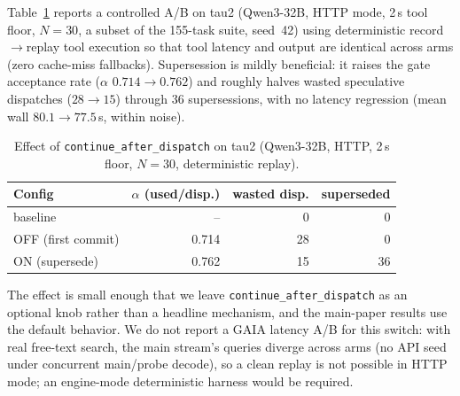 Table~\ref{tab:supersede} reports a controlled A/B on tau2 (Qwen3-32B, HTTP mode, 2\,s tool
floor, $N{=}30$, a subset of the 155-task suite, seed~42) using deterministic record$\to$replay tool execution so that tool
latency and output are identical across arms (zero cache-miss fallbacks). Supersession is
mildly beneficial: it raises the gate acceptance rate ($\alpha$ $0.714\to0.762$) and roughly
halves wasted speculative dispatches ($28\to15$) through 36 supersessions, with no latency
regression (mean wall $80.1\to77.5$\,s, within noise).

\begin{table}[t]
  \centering
  \small
  \begin{tabular}{lrrr}
    \toprule
    Config & $\alpha$ (used/disp.) & wasted disp. & superseded \\
    \midrule
    baseline      & --             & 0  & 0  \\
    OFF (first commit) & 0.714      & 28 & 0  \\
    ON (supersede)     & 0.762 & 15 & 36 \\
    \bottomrule
  \end{tabular}
  \caption{Effect of \texttt{continue\allowbreak\_after\allowbreak\_dispatch} on tau2 (Qwen3-32B, HTTP, 2\,s floor,
  $N{=}30$, deterministic replay).}
  \label{tab:supersede}
\end{table}

The effect is small enough that we leave \texttt{continue\allowbreak\_after\allowbreak\_dispatch} as an optional
knob rather than a headline mechanism, and the main-paper results use the default behavior.
We do not report a GAIA latency A/B for this switch: with real free-text search, the main
stream's queries diverge across arms (no API seed under concurrent main/probe decode), so a
clean replay is not possible in HTTP mode; an engine-mode deterministic harness would be
required.
